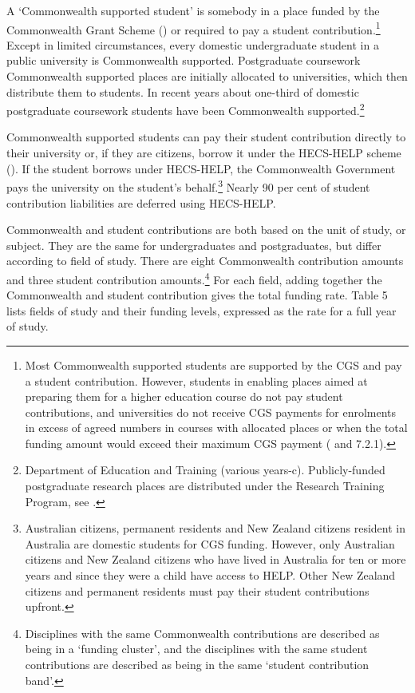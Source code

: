 \documentclass{grattan}
\begin{document}
A `Commonwealth supported student' is somebody in a place funded by the Commonwealth Grant Scheme () or required to pay a student contribution.\footnote{Most Commonwealth supported students are supported by the CGS and pay a student contribution. However, students in enabling places aimed at preparing them for a higher education course do not pay student contributions, and universities do not receive CGS payments for enrolments in excess of agreed numbers in courses with allocated places or when the total funding amount would exceed their maximum CGS payment ( and 7.2.1).} Except in limited circumstances, every domestic undergraduate student in a public university is Commonwealth supported. Postgraduate coursework Commonwealth supported places are initially allocated to universities, which then distribute them to students. In recent years about one-third of domestic postgraduate coursework students have been Commonwealth supported.\footnote{Department of Education and Training (various years-c). Publicly-funded postgraduate research places are distributed under the Research Training Program, see .}

Commonwealth supported students can pay their student contribution directly to their university or, if they are citizens, borrow it under the HECS-HELP scheme (). If the student borrows under HECS-HELP, the Commonwealth Government pays the university on the student's behalf.\footnote{Australian citizens, permanent residents and New Zealand citizens resident in Australia are domestic students for CGS funding. However, only Australian citizens and New Zealand citizens who have lived in Australia for ten or more years and since they were a child have access to HELP. Other New Zealand citizens and permanent residents must pay their student contributions upfront.} Nearly 90 per cent of student contribution liabilities are deferred using HECS-HELP.

Commonwealth and student contributions are both based on the unit of study, or subject. They are the same for undergraduates and postgraduates, but differ according to field of study. There are eight Commonwealth contribution amounts and three student contribution amounts.\footnote{Disciplines with the same Commonwealth contributions are described as being in a `funding cluster', and the disciplines with the same student contributions are described as being in the same `student contribution band'.} For each field, adding together the Commonwealth and student contribution gives the total funding rate. Table 5 lists fields of study and their funding levels, expressed as the rate for a full year of study.
\end{document}
